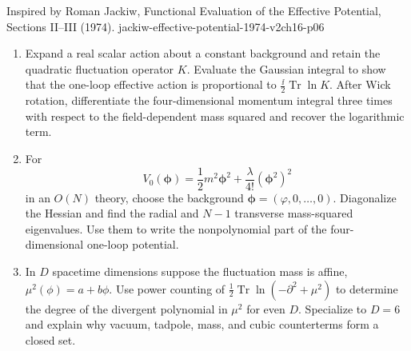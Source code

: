\begin{enumerate}
  {Inspired by Roman Jackiw, Functional Evaluation of the Effective Potential, Sections II--III (1974).}
  {jackiw-effective-potential-1974-v2ch16-p06}
  \begin{enumerate}
    \item[(a)]
    Expand a real scalar action about a constant background and retain the
    quadratic fluctuation operator \(K\).  Evaluate the Gaussian integral to
    show that the one-loop effective action is proportional to
    \(\frac{\ii}{2}\operatorname{Tr}\ln K\).  After Wick rotation, differentiate
    the four-dimensional momentum integral three times with respect to the
    field-dependent mass squared and recover the logarithmic term.
    \item[(b)]
    For
    \[
      V_0(\boldsymbol\phi)
        =\frac12m^2\boldsymbol\phi^2
         +\frac{\lambda}{4!}(\boldsymbol\phi^2)^2
    \]
    in an \(O(N)\) theory, choose the background
    \(\boldsymbol\phi=(\varphi,0,\ldots,0)\).  Diagonalize the Hessian and
    find the radial and \(N-1\) transverse mass-squared eigenvalues.  Use
    them to write the nonpolynomial part of the four-dimensional one-loop
    potential.
    \item[(c)]
    In \(D\) spacetime dimensions suppose the fluctuation mass is affine,
    \(\mu^2(\phi)=a+b\phi\).  Use power counting of
    \(\frac12\operatorname{Tr}\ln(-\partial^2+\mu^2)\) to determine the
    degree of the divergent polynomial in \(\mu^2\) for even \(D\).
    Specialize to \(D=6\) and explain why vacuum, tadpole, mass, and cubic
    counterterms form a closed set.
  \end{enumerate}


\end{enumerate}
